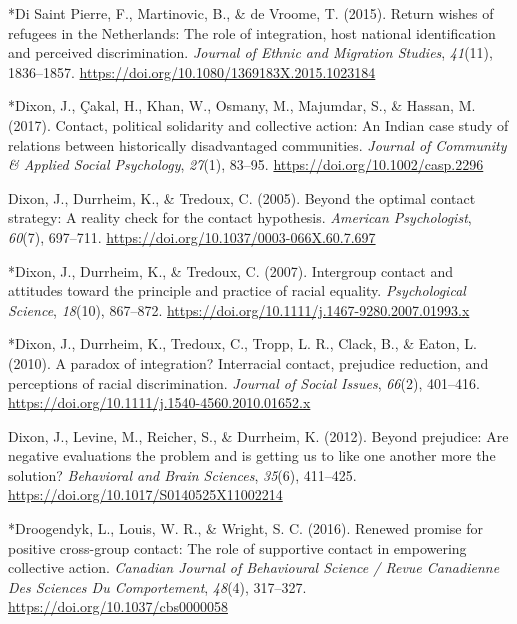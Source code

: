 \documentclass[12pt, letterpaper]{article}
\begin{document}
\leavevmode\hypertarget{ref-1807}{}%
*Di Saint Pierre, F., Martinovic, B., \& de Vroome, T. (2015). Return
wishes of refugees in the Netherlands: The role of integration, host
national identification and perceived discrimination. \emph{Journal of
Ethnic and Migration Studies}, \emph{41}(11), 1836--1857.
\url{https://doi.org/10.1080/1369183X.2015.1023184}

\leavevmode\hypertarget{ref-93}{}%
*Dixon, J., Çakal, H., Khan, W., Osmany, M., Majumdar, S., \& Hassan, M.
(2017). Contact, political solidarity and collective action: An Indian
case study of relations between historically disadvantaged communities.
\emph{Journal of Community \& Applied Social Psychology}, \emph{27}(1),
83--95. \url{https://doi.org/10.1002/casp.2296}

\leavevmode\hypertarget{ref-dixon_beyond_2005}{}%
Dixon, J., Durrheim, K., \& Tredoux, C. (2005). Beyond the optimal
contact strategy: A reality check for the contact hypothesis.
\emph{American Psychologist}, \emph{60}(7), 697--711.
\url{https://doi.org/10.1037/0003-066X.60.7.697}

\leavevmode\hypertarget{ref-1386}{}%
*Dixon, J., Durrheim, K., \& Tredoux, C. (2007). Intergroup contact and
attitudes toward the principle and practice of racial equality.
\emph{Psychological Science}, \emph{18}(10), 867--872.
\url{https://doi.org/10.1111/j.1467-9280.2007.01993.x}

\leavevmode\hypertarget{ref-336}{}%
*Dixon, J., Durrheim, K., Tredoux, C., Tropp, L. R., Clack, B., \&
Eaton, L. (2010). A paradox of integration? Interracial contact,
prejudice reduction, and perceptions of racial discrimination.
\emph{Journal of Social Issues}, \emph{66}(2), 401--416.
\url{https://doi.org/10.1111/j.1540-4560.2010.01652.x}

\leavevmode\hypertarget{ref-dixon_beyond_2012}{}%
Dixon, J., Levine, M., Reicher, S., \& Durrheim, K. (2012). Beyond
prejudice: Are negative evaluations the problem and is getting us to
like one another more the solution? \emph{Behavioral and Brain
Sciences}, \emph{35}(6), 411--425.
\url{https://doi.org/10.1017/S0140525X11002214}

\leavevmode\hypertarget{ref-2033}{}%
*Droogendyk, L., Louis, W. R., \& Wright, S. C. (2016). Renewed promise
for positive cross-group contact: The role of supportive contact in
empowering collective action. \emph{Canadian Journal of Behavioural
Science / Revue Canadienne Des Sciences Du Comportement}, \emph{48}(4),
317--327. \url{https://doi.org/10.1037/cbs0000058}
\end{document}
